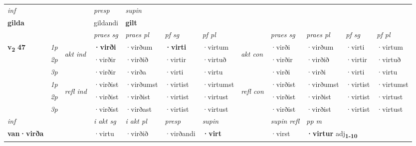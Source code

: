 \begin{longtable}[l]{X>{\footnotesize\itshape}llXXXXlXXXX}
\cmidrule{4-7}
   {\textit{inf}} & &     & \textit{presp} & \textit{supin}   \\*
  {\textbf{gilda}} & &     & gildandi &  \textbf{gilt}   \\*

\midrule

 & &   & \textit{praes sg}  & \textit{praes pl}    & \textit{ pf sg} & \textit{pf pl} & & \textit{praes sg}  & \textit{praes pl}    & \textit{pf sg} & \textit{pf pl }  \\ \cmidrule{4-7} \cmidrule{9-12}
 \multirow{2}{*}{{{\textbf{v{\textsubscript{2}}} \Large{\textbf{47}}}}}  & 1p & \multirow{3}{*}{\begin{turn}{90}\textit{akt ind}\end{turn}} & \textbf{·virði} & ·virðum & \textbf{·virti} & ·virtum & \multirow{3}{*}{\begin{turn}{90}\textit{akt con}\end{turn}} &·virði & ·virðum & ·virti & ·virtum\\*
 & 2p &  &  ·virðir  & ·virðið & ·virtir & ·virtuð & & ·virðir & ·virðið & ·virtir & ·virtuð \\*
 & 3p &  & ·virðir & ·virða & ·virti & ·virtu & & ·virði & ·virði& ·virti & ·virtu \\*
\cmidrule{4-7} \cmidrule{9-12}
 & 1p & \multirow{3}{*}{\begin{turn}{90}\textit{refl ind}\end{turn}}  & ·virðist & ·virðumst & ·virtist & ·virtumst & \multirow{3}{*}{\begin{turn}{90}\textit{refl con}\end{turn}}  &·virðist & ·virðumst & ·virtist & ·virtumst \\*
 & 2p &  & ·virðist & ·virðist & ·virtist & ·virtust & &·virðist & ·virðist & ·virtist & ·virtust \\*
 & 3p  & & ·virðist & ·virðast & ·virtist & ·virtust & & ·virðist & ·virðist& ·virtist & ·virtust \\*
\cmidrule{4-7} \cmidrule{9-12}

   {\textit{inf}} & &  & \textit{i akt sg} & \textit{i akt pl}   & \textit{presp} & \textit{supin} && \textit{supin refl} & \textit{pp m} \\*
  {\textbf{van\allowbreak ·virða}} & && ·virtu  & ·virðið   & ·virðandi &  \textbf{·virt} && ·virst & \multicolumn{2}{l}{\textbf{·virtur} adj\textbf{\textsubscript{1-10}}} \\*

\midrule


\end{longtable}
